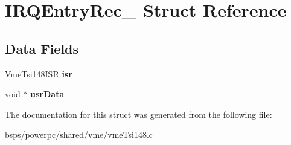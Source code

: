 \hypertarget{structIRQEntryRec__}{}\section{I\+R\+Q\+Entry\+Rec\+\_\+ Struct Reference}
\label{structIRQEntryRec__}
\subsection*{Data Fields}
\begin{DoxyCompactItemize}
\item 
\mbox{\label{structIRQEntryRec___a217304a944935488a30bef279df401ec}} 
Vme\+Tsi148\+I\+SR {\bfseries isr}
\item 
\mbox{\label{structIRQEntryRec___a51a42f69c3e62f26c893a285b62fcb02}} 
void $\ast$ {\bfseries usr\+Data}
\end{DoxyCompactItemize}


The documentation for this struct was generated from the following file\+:\begin{DoxyCompactItemize}
\item 
bsps/powerpc/shared/vme/vme\+Tsi148.\+c\end{DoxyCompactItemize}
